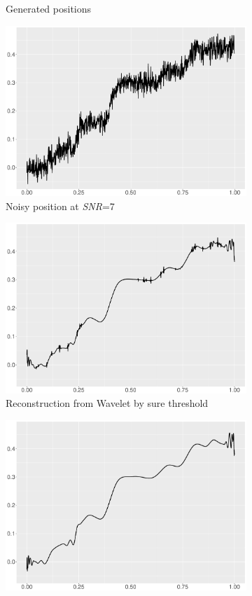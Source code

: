 \begin{figure}
\begin{subfigure}{0.45\textwidth}
    \caption{Generated positions}
    \end{subfigure}
    \begin{subfigure}{0.45\textwidth}
    \centering
    \includegraphics[width=\linewidth,height=0.45\textwidth]{Chapters/02TractorSplineTheory/plot/ggplot/ggBumpsPositionNoise.pdf}
    \caption{Noisy position at \textit{SNR}=7}
    \end{subfigure}
    \begin{subfigure}{0.45\textwidth}
    \centering
    \includegraphics[width=\linewidth,height=0.45\textwidth]{Chapters/02TractorSplineTheory/plot/ggplot/ggBumpsSure.pdf}
    \caption{Reconstruction from Wavelet by sure threshold}
    \end{subfigure}
    \begin{subfigure}{0.45\textwidth}
    \centering
    \includegraphics[width=\linewidth,height=0.45\textwidth]{Chapters/02TractorSplineTheory/plot/ggplot/ggBumpsBayes.pdf}

\end{subfigure}
\end{figure}
